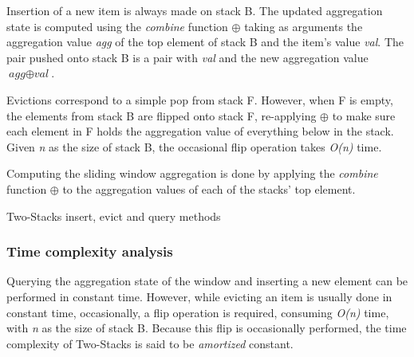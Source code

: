 Insertion of a new item is always made on stack B. The updated aggregation state is computed using the \textit{combine} function $\oplus$ taking as arguments the aggregation value \textit{agg} of the top element of stack B and the item's value \textit{val}. The pair pushed onto stack B is a pair with \textit{val} and the new aggregation value $\textit{agg} \oplus \textit{val}$.

Evictions correspond to a simple pop from stack F. However, when F is empty, the elements from stack B are flipped onto stack F, re-applying $\oplus$ to make sure each element in F holds the aggregation value of everything below in the stack. Given \textit{n} as the size of stack B, the occasional flip operation takes \textit{O(n)} time.

Computing the sliding window aggregation is done by applying the \textit{combine} function $\oplus$ to the aggregation values of each of the stacks' top element. 

\begin{algorithm}
    \caption{Two-Stacks insert, evict and query methods}
    \label{pseudo:2-stacks}
    \begin{algorithmic}[1]
            \State \Return{$\overline{\theta}$} 
        \Else 
            \State {} 
        \EndIf
        \EndFunction
        
            \State {}
        \EndFunction
        
        
        \EndFunction
        
        
        
             
                \EndWhile
            \EndIf
        \EndFunction
    \end{algorithmic}
\end{algorithm}

\subsubsection*{Time complexity analysis}
Querying the aggregation state of the window and inserting a new element can be performed in constant time. However, while evicting an item is usually done in constant time, occasionally, a flip operation is required, consuming \textit{O(n)} time, with \textit{n} as the size of stack B. Because this flip is occasionally performed, the time complexity of Two-Stacks is said to be \textit{amortized} constant.

